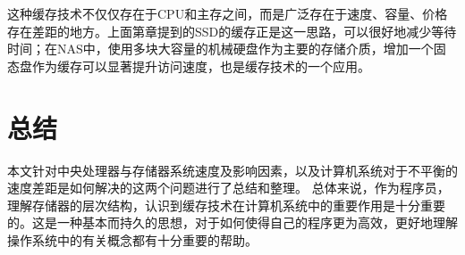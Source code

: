 \documentclass[final]{cvpr}
\begin{document}
这种缓存技术不仅仅存在于CPU和主存之间，而是广泛存在于速度、容量、价格存在差距的地方。上面第\label{sec:RAM}章提到的SSD的缓存正是这一思路，可以很好地减少等待时间；在NAS中，使用多块大容量的机械硬盘作为主要的存储介质，增加一个固态盘作为缓存可以显著提升访问速度，也是缓存技术的一个应用。


\section{总结}\label{sec:Conclusion}

本文针对中央处理器与存储器系统速度及影响因素，以及计算机系统对于不平衡的速度差距是如何解决的这两个问题进行了总结和整理。
总体来说，作为程序员，理解存储器的层次结构，认识到缓存技术在计算机系统中的重要作用是十分重要的。这是一种基本而持久\cite{CSAPP}的思想，对于如何使得自己的程序更为高效，更好地理解操作系统中的有关概念都有十分重要的帮助。



{\small


}


\end{document}
